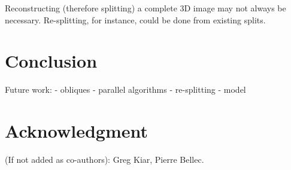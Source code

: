 \documentclass[10pt, conference, compsocconf]{IEEEtran}
\begin{document}
Reconstructing (therefore splitting) a complete 3D image may not
always be necessary. Re-splitting, for instance, could be done from
existing splits.

\section{Conclusion}

Future work:
- obliques
- parallel algorithms
- re-splitting
- model

\section*{Acknowledgment}

(If not added as co-authors): Greg Kiar, Pierre Bellec.



\end{document}
